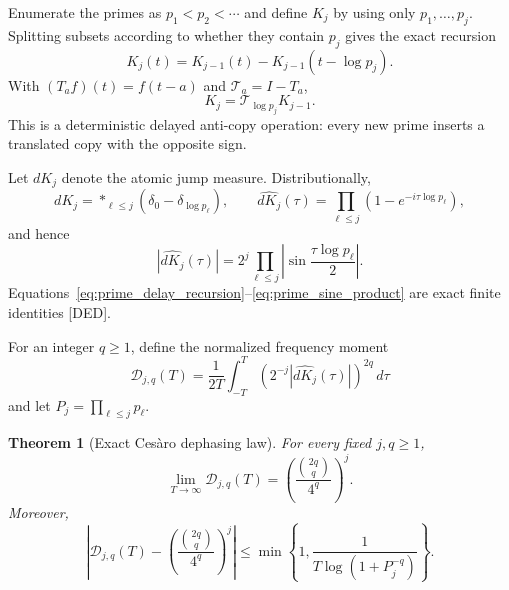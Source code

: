 \documentclass[11pt]{amsart}
\numberwithin{equation}{section}
\theoremstyle{plain}
\newtheorem{theorem}{Theorem}[section]
\theoremstyle{definition}
\theoremstyle{remark}
\begin{document}
Enumerate the primes as $p_1<p_2<\cdots$ and define $K_j$ by using only
$p_1,\ldots,p_j$.  Splitting subsets according to whether they contain $p_j$
gives the exact recursion
\begin{equation}
K_j(t)=K_{j-1}(t)-K_{j-1}(t-\log p_j).
\label{eq:prime_delay_recursion}
\end{equation}
With $(T_af)(t)=f(t-a)$ and $\mathcal T_a=I-T_a$,
\begin{equation}
K_j=\mathcal T_{\log p_j}K_{j-1}.
\label{eq:prime_transfer_operator}
\end{equation}
This is a deterministic delayed anti-copy operation: every new prime inserts
a translated copy with the opposite sign.

Let $dK_j$ denote the atomic jump measure.  Distributionally,
\begin{equation}
dK_j=\mathop{\ast}_{\ell\leq j}
  (\delta_0-\delta_{\log p_\ell}),
\qquad
\widehat{dK_j}(\tau)=
\prod_{\ell\leq j}(1-e^{-i\tau\log p_\ell}),
\label{eq:prime_interference_product}
\end{equation}
and hence
\begin{equation}
|\widehat{dK_j}(\tau)|
=2^j\prod_{\ell\leq j}
\left|\sin\frac{\tau\log p_\ell}{2}\right|.
\label{eq:prime_sine_product}
\end{equation}
Equations~\eqref{eq:prime_delay_recursion}--\eqref{eq:prime_sine_product}
are exact finite identities \textnormal{[DED]}.

For an integer $q\geq1$, define the normalized frequency moment
\begin{equation}
\mathcal D_{j,q}(T)=\frac1{2T}\int_{-T}^{T}
\left(2^{-j}|\widehat{dK_j}(\tau)|\right)^{2q}\,d\tau
\end{equation}
and let $P_j=\prod_{\ell\leq j}p_\ell$.

\begin{theorem}[Exact Ces\`aro dephasing law]
\label{thm:exact_tau_dephasing}
For every fixed $j,q\geq1$,
\begin{equation}
\lim_{T\to\infty}\mathcal D_{j,q}(T)
=\left(\frac{\binom{2q}{q}}{4^q}\right)^j.
\label{eq:exact_tau_limit}
\end{equation}
Moreover,
\begin{equation}
\left|\mathcal D_{j,q}(T)-
\left(\frac{\binom{2q}{q}}{4^q}\right)^j\right|
\leq
\min\!\left\{1,
\frac{1}{T\log(1+P_j^{-q})}\right\}.
\label{eq:finite_tau_error}
\end{equation}
\end{theorem}
\end{document}
